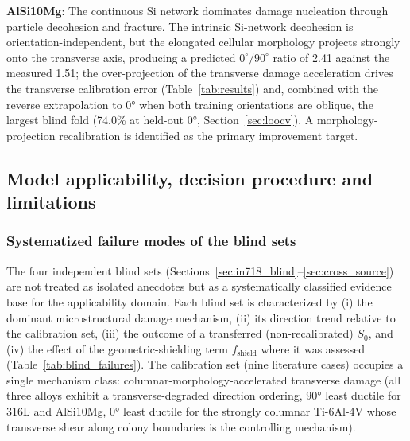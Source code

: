\documentclass[twocolumn]{sagej}
\begin{document}
\textbf{AlSi10Mg}: The continuous Si network dominates damage nucleation through particle decohesion and fracture. The intrinsic Si-network decohesion is orientation-independent, but the elongated cellular morphology projects strongly onto the transverse axis, producing a predicted $0^\circ/90^\circ$ ratio of 2.41 against the measured 1.51; the over-projection of the transverse damage acceleration drives the transverse calibration error (Table~\ref{tab:results}) and, combined with the reverse extrapolation to $\ang{0}$ when both training orientations are oblique, the largest blind fold (74.0\% at held-out $\ang{0}$, Section~\ref{sec:loocv}). A morphology-projection recalibration is identified as the primary improvement target.

\subsection{Model applicability, decision procedure and limitations}

\subsubsection{Systematized failure modes of the blind sets}
\label{sec:applicability}

The four independent blind sets (Sections~\ref{sec:in718_blind}--\ref{sec:cross_source}) are not treated as isolated anecdotes but as a systematically classified evidence base for the applicability domain. Each blind set is characterized by (i) the dominant microstructural damage mechanism, (ii) its direction trend relative to the calibration set, (iii) the outcome of a transferred (non-recalibrated) $S_0$, and (iv) the effect of the geometric-shielding term $f_{\text{shield}}$ where it was assessed (Table~\ref{tab:blind_failures}). The calibration set (nine literature cases) occupies a single mechanism class: columnar-morphology-accelerated transverse damage (all three alloys exhibit a transverse-degraded direction ordering, $\ang{90}$ least ductile for 316L and AlSi10Mg, $\ang{0}$ least ductile for the strongly columnar Ti-6Al-4V whose transverse shear along colony boundaries is the controlling mechanism).
\end{document}
